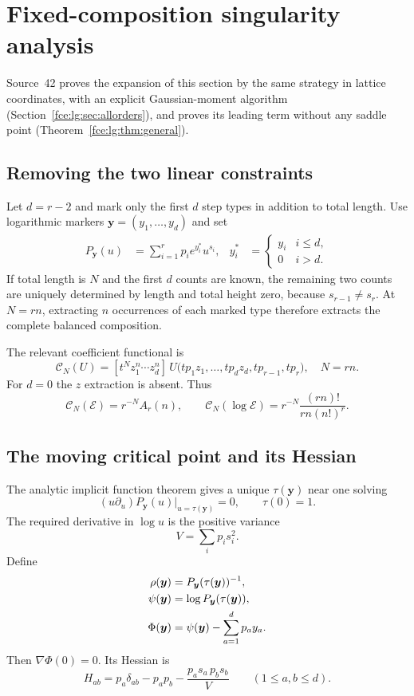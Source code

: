 \documentclass[11pt,a4paper]{article}
\numberwithin{equation}{section}
\theoremstyle{definition}\newtheorem{definition}[theorem]{Definition}
\theoremstyle{remark}\newtheorem{remark}[theorem]{Remark}
\newcommand{\E}{\mathcal E}
\begin{document}
\section{Fixed-composition singularity analysis}\label{fce:sec:saddle}
Source~42 proves the expansion of this section by the same strategy in
lattice coordinates, with an explicit Gaussian-moment algorithm
(Section~\ref{fce:lg:sec:allorders}), and proves its leading term without
any saddle point (Theorem~\ref{fce:lg:thm:general}).
\subsection{Removing the two linear constraints}
Let $d=r-2$ and mark only the first $d$ step types in addition to total
length. Use logarithmic markers $\boldsymbol y=(y_1,\ldots,y_d)$ and set
\begin{align}
 P_{\boldsymbol y}(u)
 &=\sum_{i=1}^r p_i e^{y_i^*}u^{s_i},
 &y_i^*&=\begin{cases}y_i&i\le d,\\0&i>d.\end{cases}\label{fce:eq:markedP}
\end{align}
If total length is $N$ and the first $d$ counts are known, the remaining
two counts are uniquely determined by length and total height zero,
because $s_{r-1}\ne s_r$. At $N=rn$, extracting $n$ occurrences of each
marked type therefore extracts the complete balanced composition.

The relevant coefficient functional is
\begin{equation}\label{fce:eq:coefficientfunctional}
 \mathcal C_N(U)=[t^N z_1^n\cdots z_d^n]\,
 U\bigl(tp_1z_1,\ldots,tp_dz_d,tp_{r-1},tp_r\bigr),\quad N=rn.
\end{equation}
For $d=0$ the $z$ extraction is absent. Thus
\[
 \mathcal C_N(\E)=r^{-N}A_r(n),\qquad
 \mathcal C_N(\log\E)=r^{-N}\frac{(rn)!}{rn(n!)^r}.
\]

\subsection{The moving critical point and its Hessian}
The analytic implicit function theorem gives a unique $\tau(\boldsymbol y)$
near one solving
\begin{equation}\label{fce:eq:criticalmoving}
 (u\partial_u)P_{\boldsymbol y}(u)\big|_{u=\tau(\boldsymbol y)}=0,
 \qquad \tau(0)=1.
\end{equation}
The required derivative in $\log u$ is the positive variance
\[
 V=\sum_i p_i s_i^2.
\]
Define
\begin{align}
 \rho(\boldsymbol y)&=P_{\boldsymbol y}(\tau(\boldsymbol y))^{-1},\notag\\
 \psi(\boldsymbol y)&=\log P_{\boldsymbol y}(\tau(\boldsymbol y)),\notag\\
 \Phi(\boldsymbol y)&=\psi(\boldsymbol y)-\sum_{a=1}^d p_a y_a.
 \label{fce:eq:phase}
\end{align}
Then $\nabla\Phi(0)=0$. Its Hessian is
\begin{equation}\label{fce:eq:H}
 H_{ab}=p_a\delta_{ab}-p_ap_b-
            \frac{p_as_a\,p_bs_b}{V}\qquad(1\le a,b\le d).
\end{equation}
\end{document}
